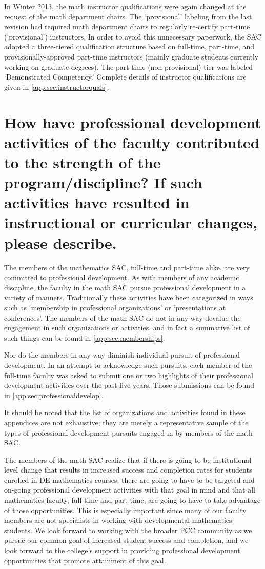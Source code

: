 In Winter 2013, the math instructor qualifications were again changed at the
request of the math department chairs.  The `provisional' labeling
from the last revision had required math department chairs to regularly
re-certify part-time (`provisional') instructors.  In order to avoid this
unnecessary paperwork, the SAC adopted a three-tiered qualification structure
based on full-time, part-time, and provisionally-approved part-time instructors
(mainly graduate students currently working on graduate degrees).  The
part-time (non-provisional) tier was labeled `Demonstrated Competency.'
Complete details of instructor qualifications are given in \vref{app:sec:instructorquals}.


\section[Professional development activities]{How have professional development
 activities of the faculty contributed to the strength of the
 program/discipline? If such activities have resulted in instructional or
curricular changes, please describe.}

The members of the mathematics SAC, full-time and part-time alike, are very
committed to professional development.  As with members of any academic
discipline, the faculty in the math SAC pursue professional development in a
variety of manners.  Traditionally these activities have been categorized in
ways such as `membership in professional organizations' or `presentations at
conferences'.  The members of the math SAC do not in any way devalue the
engagement in such organizations or activities, and in fact a summative list of
such things can be found in \vref{app:sec:memberships}.

Nor do the members in any way diminish individual pursuit of professional
development.  In an attempt to acknowledge such pursuits, each member of the
full-time faculty was asked to submit one or two highlights of their
professional development activities over the past five years.  Those
submissions can be found in \vref{app:sec:professionaldevelop}.

It should be noted that the list of organizations and activities found in these
appendices are not exhaustive; they are merely a representative sample of
the types of professional development pursuits engaged in by members of the
math SAC.

The members of the math SAC realize that if there is going to be
institutional-level change that results in increased success and completion
rates for students enrolled in DE mathematics courses, there are going to have
to be targeted and on-going professional development activities with that goal
in mind and that all mathematics faculty, full-time and part-time, are going to
have to take advantage of those opportunities.  This is especially important
since many of our faculty members are not specialists in working with
developmental mathematics students. We look forward to working with the broader
PCC community as we pursue our common goal of increased student success and
completion, and we look forward to the college's support in providing
professional development opportunities that promote attainment of this goal.

